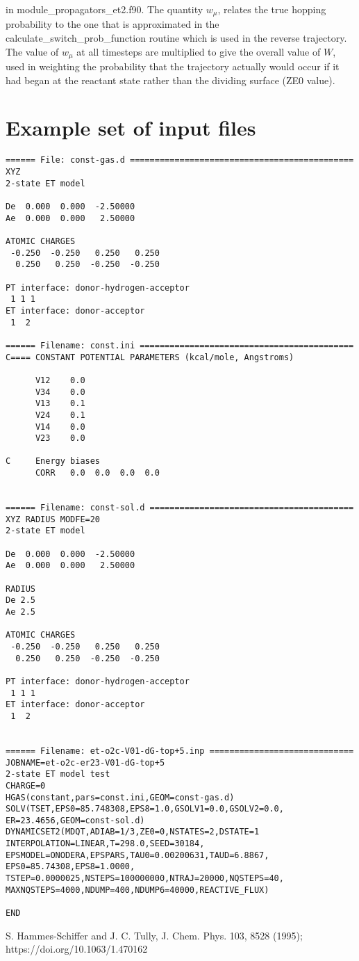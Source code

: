 \documentclass[aps,amsfonts,amsmath,amssymb,onecolumn,tightenlines,notitlepage]{revtex4-2}
\begin{document}
\vspace{0.5cm}
 in {\ttfamily module\_propagators\_et2.f90}. The quantity $w_\mu$, relates the true hopping probability to the one that is approximated in the {\ttfamily calculate\_switch\_prob\_function} routine which is used in the reverse trajectory. The value of $w_\mu$ at all timesteps are multiplied to give the overall value of $W$, used in weighting the probability that the trajectory actually would occur if it had began at the reactant state rather than the dividing surface ({\ttfamily ZE0} value).

\section{Example set of input files}

\begin{verbatim}
====== File: const-gas.d =============================================
XYZ
2-state ET model

De  0.000  0.000  -2.50000
Ae  0.000  0.000   2.50000

ATOMIC CHARGES
 -0.250  -0.250   0.250   0.250
  0.250   0.250  -0.250  -0.250

PT interface: donor-hydrogen-acceptor
 1 1 1
ET interface: donor-acceptor
 1  2

====== Filename: const.ini ===========================================
C==== CONSTANT POTENTIAL PARAMETERS (kcal/mole, Angstroms)

      V12    0.0
      V34    0.0
      V13    0.1
      V24    0.1
      V14    0.0
      V23    0.0

C     Energy biases
      CORR   0.0  0.0  0.0  0.0


====== Filename: const-sol.d =========================================
XYZ RADIUS MODFE=20
2-state ET model

De  0.000  0.000  -2.50000
Ae  0.000  0.000   2.50000

RADIUS
De 2.5
Ae 2.5

ATOMIC CHARGES
 -0.250  -0.250   0.250   0.250
  0.250   0.250  -0.250  -0.250

PT interface: donor-hydrogen-acceptor
 1 1 1
ET interface: donor-acceptor
 1  2


====== Filename: et-o2c-V01-dG-top+5.inp =============================
JOBNAME=et-o2c-er23-V01-dG-top+5
2-state ET model test
CHARGE=0
HGAS(constant,pars=const.ini,GEOM=const-gas.d)
SOLV(TSET,EPS0=85.748308,EPS8=1.0,GSOLV1=0.0,GSOLV2=0.0,
ER=23.4656,GEOM=const-sol.d)
DYNAMICSET2(MDQT,ADIAB=1/3,ZE0=0,NSTATES=2,DSTATE=1
INTERPOLATION=LINEAR,T=298.0,SEED=30184,
EPSMODEL=ONODERA,EPSPARS,TAU0=0.00200631,TAUD=6.8867,
EPS0=85.74308,EPS8=1.0000,
TSTEP=0.0000025,NSTEPS=100000000,NTRAJ=20000,NQSTEPS=40,
MAXNQSTEPS=4000,NDUMP=400,NDUMP6=40000,REACTIVE_FLUX)

END

\end{verbatim}


%

\begin{thebibliography}{99}
 S. Hammes-Schiffer and J. C. Tully, J. Chem. Phys. 103, 8528 (1995); https://doi.org/10.1063/1.470162
\end{thebibliography}
\end{document}
